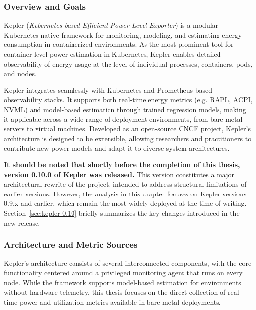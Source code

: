 \subsubsection{Overview and Goals}
\label{sec:kepler-overview}

Kepler (\textit{Kubernetes-based Efficient Power Level Exporter})\parencite{kepler_energy} is a modular, Kubernetes-native framework for monitoring, modeling, and estimating energy consumption in containerized environments. As the most prominent tool for container-level power estimation in Kubernetes, Kepler enables detailed observability of energy usage at the level of individual processes, containers, pods, and nodes\parencite{amaralKeplerFrameworkCalculate2023}.

Kepler integrates seamlessly with Kubernetes and Prometheus-based observability stacks. It supports both real-time energy metrics (e.g. RAPL, ACPI, NVML) and model-based estimation through trained regression models, making it applicable across a wide range of deployment environments, from bare-metal servers to virtual machines. Developed as an open-source CNCF project, Kepler’s architecture is designed to be extensible, allowing researchers and practitioners to contribute new power models and adapt it to diverse system architectures.

\textbf{It should be noted that shortly before the completion of this thesis, version 0.10.0 of Kepler was released.} This version constitutes a major architectural rewrite of the project, intended to address structural limitations of earlier versions. However, the analysis in this chapter focuses on Kepler versions 0.9.x and earlier, which remain the most widely deployed at the time of writing. Section~\ref{sec:kepler-0.10} briefly summarizes the key changes introduced in the new release.

\subsubsection{Architecture and Metric Sources}
\label{sec:kepler-architecture}

Kepler's architecture consists of several interconnected components, with the core functionality centered around a privileged monitoring agent that runs on every node. While the framework supports model-based estimation for environments without hardware telemetry, this thesis focuses on the direct collection of real-time power and utilization metrics available in bare-metal deployments.

